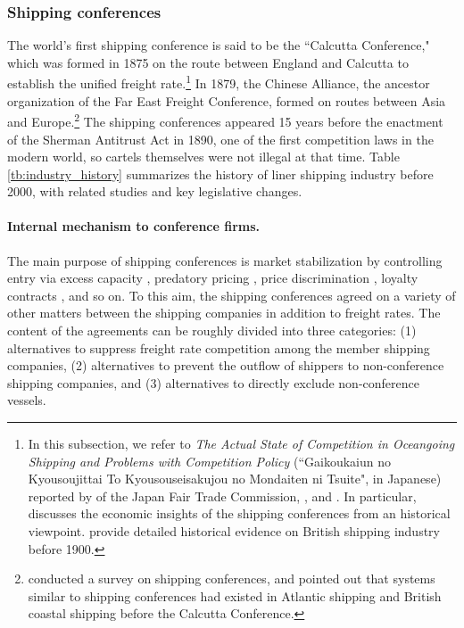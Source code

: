 \documentclass[11pt]{article}
\begin{document}
\subsubsection{Shipping conferences}\label{subsec:shipping_conference}
The world's first shipping conference is said to be the ``Calcutta Conference," which was formed in 1875 on the route between England and Calcutta to establish the unified freight rate.\footnote{In this subsection, we refer to \textit{The Actual State of Competition in Oceangoing Shipping and Problems with Competition Policy} (``Gaikoukaiun no Kyousoujittai To Kyousouseisakujou no Mondaiten ni Tsuite", in Japanese) reported by \cite{gaikoukaiun_no_kyousoujittai2006} of the Japan Fair Trade Commission,  \cite{branch2013maritime}, and \cite{sjostrom2013competition}. In particular, \cite{sjostrom1989collusion} discusses the economic insights of the shipping conferences from an historical viewpoint. \cite{morton1997entry} provide detailed historical evidence on British shipping industry before 1900.} In 1879, the Chinese Alliance, the ancestor organization of the Far East Freight Conference, formed on routes between Asia and Europe.\footnote{\cite{sjostrom2004ocean} conducted a survey on shipping conferences, and pointed out that systems similar to shipping conferences had existed in Atlantic shipping and British coastal shipping before the Calcutta Conference.} The shipping conferences appeared 15 years before the enactment of the Sherman Antitrust Act in 1890, one of the first competition laws in the modern world, so cartels themselves were not illegal at that time. Table \ref{tb:industry_history} summarizes the history of liner shipping industry before 2000, with related studies and key legislative changes.

\paragraph{Internal mechanism to conference firms.}
The main purpose of shipping conferences is market stabilization by controlling entry via excess capacity \citep{fusillo2003excess}, predatory pricing \citep{morton1997entry,podolny1999social}, price discrimination \citep{fox1992empirical,clyde1998market}, loyalty contracts \citep{marin2003exclusive}, and so on. To this aim, the shipping conferences agreed on a variety of other matters between the shipping companies in addition to freight rates. The content of the agreements can be roughly divided into three categories: (1) alternatives to suppress freight rate competition among the member shipping companies, (2) alternatives to prevent the outflow of shippers to non-conference shipping companies, and (3) alternatives to directly exclude non-conference vessels.
\end{document}
